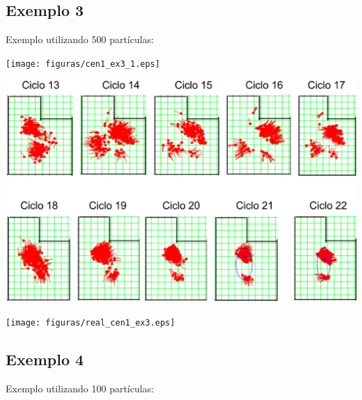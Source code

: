 \subsection{Exemplo 3}

Exemplo utilizando 500 partículas:

{\centering
\texttt{[image: figuras/cen1\_ex3\_1.eps]}
\label{img:cen1_ex3_1}
\par}

{\centering
\includegraphics[scale=0.4]{figuras/cen1_ex3_2.eps}
\label{img:cen1_ex3_2}
\par}

{\centering
\texttt{[image: figuras/real\_cen1\_ex3.eps]}
\label{img:real_cen1_ex3}
\par}

\subsection{Exemplo 4}

Exemplo utilizando 100 partículas:

